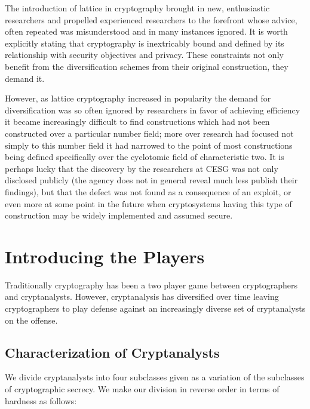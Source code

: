 \documentclass{article}
\begin{document}
The introduction of lattice in cryptography brought in new,
enthusiastic researchers and propelled experienced researchers to the
forefront whose advice, often repeated was misunderstood and in many
instances ignored.
It is worth explicitly stating that cryptography is inextricably bound and
defined by its relationship with security objectives and privacy. These
constraints not only benefit from the diversification schemes from
their original construction, they demand it.

However, as lattice cryptography increased in popularity the demand
for diversification was so often ignored by researchers in favor of
achieving efficiency it became increasingly difficult to find
constructions which had not been constructed over a particular number
field; more over research had focused not simply to this number field
it had narrowed to the point of most constructions being defined
specifically over the cyclotomic field of characteristic two.
It is perhaps lucky that the discovery by the researchers at CESG was
not only disclosed publicly (the agency does not in general reveal much
less publish their findings), but that the defect was not found as a
consequence of an exploit, or even more at some point in the future
when cryptosystems having this type of construction may be widely
implemented and assumed secure.

\section{Introducing the Players}

Traditionally cryptography has been a two player game between
cryptographers and cryptanalysts. However, cryptanalysis has
diversified over time leaving cryptographers to play defense against an
increasingly diverse set of cryptanalysts on the offense.

\subsection{Characterization of Cryptanalysts}

We divide cryptanalysts into four subclasses given as a variation of
the subclasses of cryptographic secrecy.
We make our division in reverse order in terms of hardness as
follows:
\end{document}
